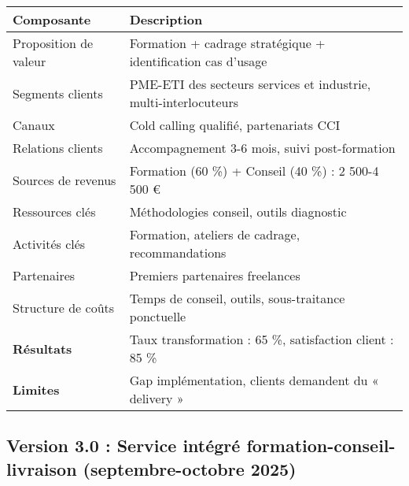 \begin{longtable}{@{}>{\raggedright\arraybackslash}p{4cm}>{\raggedright\arraybackslash}p{10cm}@{}}
\toprule
\textbf{Composante} & \textbf{Description} \\
\midrule
Proposition de valeur & Formation + cadrage stratégique + identification cas d’usage \\
Segments clients & PME-ETI des secteurs services et industrie, multi-interlocuteurs \\
Canaux & Cold calling qualifié, partenariats CCI \\
Relations clients & Accompagnement 3-6 mois, suivi post-formation \\
Sources de revenus & Formation (60 \%) + Conseil (40 \%) : 2 500-4 500 € \\
Ressources clés & Méthodologies conseil, outils diagnostic \\
Activités clés & Formation, ateliers de cadrage, recommandations \\
Partenaires & Premiers partenaires freelances \\
Structure de coûts & Temps de conseil, outils, sous-traitance ponctuelle \\
\midrule
\textbf{Résultats} & Taux transformation : 65 \%, satisfaction client : 85 \% \\
\textbf{Limites} & Gap implémentation, clients demandent du « delivery » \\
\bottomrule
\end{longtable}

\subsection{Version 3.0 : Service intégré formation-conseil-livraison (septembre-octobre 2025)}

